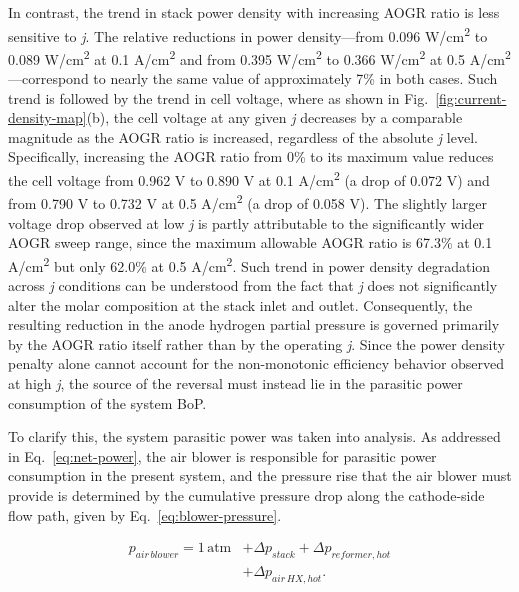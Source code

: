 \documentclass[a4paper,10pt]{cas-dc} %
\begin{document}
In contrast, the trend in stack power density with increasing AOGR ratio is less sensitive to \emph{j}.
The relative reductions in power density---from 0.096 W/cm\textsuperscript{2} to 0.089 W/cm\textsuperscript{2} at 0.1 A/cm\textsuperscript{2} and from 0.395 W/cm\textsuperscript{2} to 0.366 W/cm\textsuperscript{2} at 0.5 A/cm\textsuperscript{2}---correspond to nearly the same value of approximately 7\% in both cases.
Such trend is followed by the trend in cell voltage, where as shown in Fig.~\ref{fig:current-density-map}(b), the cell voltage at any given \emph{j} decreases by a comparable magnitude as the AOGR ratio is increased, regardless of the absolute \emph{j} level.
Specifically, increasing the AOGR ratio from 0\% to its maximum value reduces the cell voltage from 0.962 V to 0.890 V at 0.1 A/cm\textsuperscript{2} (a drop of 0.072 V) and from 0.790 V to 0.732 V at 0.5 A/cm\textsuperscript{2} (a drop of 0.058 V).
The slightly larger voltage drop observed at low \emph{j} is partly attributable to the significantly wider AOGR sweep range, since the maximum allowable AOGR ratio is 67.3\% at 0.1 A/cm\textsuperscript{2} but only 62.0\% at 0.5 A/cm\textsuperscript{2}.
Such trend in power density degradation across \emph{j} conditions can be understood from the fact that \emph{j} does not significantly alter the molar composition at the stack inlet and outlet.
Consequently, the resulting reduction in the anode hydrogen partial pressure is governed primarily by the AOGR ratio itself rather than by the operating \emph{j}.
Since the power density penalty alone cannot account for the non-monotonic efficiency behavior observed at high \emph{j}, the source of the reversal must instead lie in the parasitic power consumption of the system BoP.

To clarify this, the system parasitic power was taken into analysis.
As addressed in Eq.~\eqref{eq:net-power}, the air blower is responsible for parasitic power consumption in the present system, and the pressure rise that the air blower must provide is determined by the cumulative pressure drop along the cathode-side flow path, given by Eq.~\eqref{eq:blower-pressure}.

\begin{equation}
\begin{split}
p_{air\,blower} = 1\,\mathrm{atm} &+ \Delta p_{stack} + \Delta p_{reformer,hot} \\
&+ \Delta p_{air\,HX,hot}.
\end{split}
\label{eq:blower-pressure}
\end{equation}
\end{document}
